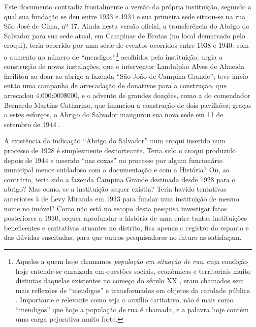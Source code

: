 Este documento contradiz frontalmente a versão da própria instituição, segundo a qual sua fundação se deu entre 1933 e 1934 e sua primeira sede situou-se na rua São José de Cima, nº 17. Ainda nesta versão oficial, a transferência do Abrigo do Salvador para sua sede atual, em Campinas de Brotas (no local demarcado pelo croqui), teria ocorrido por uma série de eventos ocorridos entre 1938 e 1940: com o aumento no número de ``mendigos''\footnote{Aqueles a quem hoje chamamos \textit{população em situação de rua}, cuja condição hoje entende-se enraizada em questões sociais, econômicas e territoriais muito distintas daquelas existentes no começo do século XX \cite{snow_desafortunados_1998}, eram chamados sem mais reflexões de ``mendigos'' e transformados em objetos da caridade pública \cite{fraga_mendigos_1996}. Importante e relevante como seja o auxílio caritativo, não é mais como ``mendigos'' que hoje a população de rua é chamada, e a palavra hoje contém uma carga pejorativa muito forte.} acolhidos pela instituição, urgia a construção de novas instalações, que o interventor Landulpho Alves de Almeida facilitou ao doar ao abrigo a fazenda ``São João de Campina Grande''; teve início então uma campanha de arrecadação de donativos para a construção, que arrecadou 4.000:000\$000, e o advento de grandes doações, como a do comendador Bernardo Martins Catharino, que financiou a construção de dois pavilhões; graças a estes esforços, o Abrigo do Salvador inaugurou sua nova sede em 11 de setembro de 1944 \cite{abrigosalvador_2015}. 

A existência da indicação ``Abrigo do Salvador'' num croqui inserido num processo de 1928 é simplesmente desnorteante. Teria sido o croqui produzido depois de 1944 e inserido ``nas coxas'' no processo por algum funcionário municipal menos cuidadoso com a documentação e com a História? Ou, ao contrário, teria sido a fazenda Campina Grande destinada desde 1928 para o abrigo? Mas como, se a instituição sequer existia? Teria havido tentativas anteriores à de Levy Miranda em 1933 para fundar uma instituição de mesmo nome no imóvel? Como não está no escopo desta pesquisa investigar fatos posteriores a 1930, sequer aprofundar a história de uma entre tantas instituições beneficentes e caritativas atuantes no distrito, fica apenas o registro do espanto e das dúvidas suscitadas, para que outros pesquisadores no futuro as satisfaçam. 

